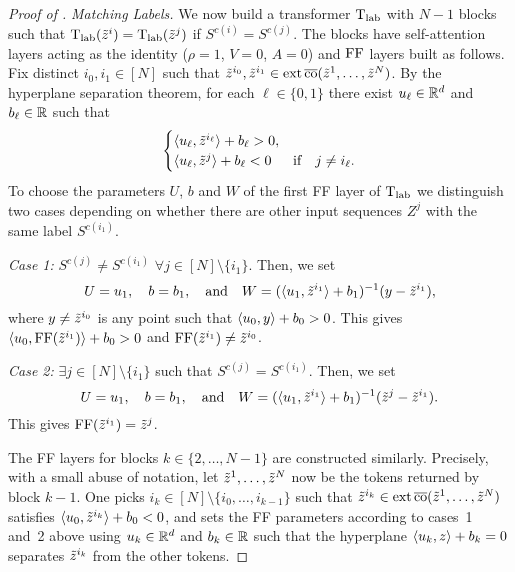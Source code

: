 \documentclass[11pt,a4paper]{amsart}
\begin{document}
\begin{proof}[Proof of ]
\noindent\textit{Matching Labels.} We now build a transformer $\operatorname{\mathrm{T}}_{\text{lab}}$ with $N-1$ blocks such that $\operatorname{\mathrm{T}}_{\text{lab}}(\Tilde{z}^i) = \operatorname{\mathrm{T}}_{\text{lab}}(\Tilde{z}^j)$ if $S^{c(i)}=S^{c(j)}$. The blocks have self-attention layers acting as the identity ($\rho = 1$, $V = 0$, $A = 0$) and $\operatorname{\mathrm{FF}}$ layers built as follows. Fix distinct $i_0, i_1 \in [N]$ such that $\Tilde{z}^{i_0}, \Tilde{z}^{i_1}\in \operatorname{ext} \operatorname{\overline{co}} (\Tilde{z}^1,\dots,\Tilde{z}^N)$. By the hyperplane separation theorem, for each $\ell\in\{0,1\}$ there exist $u_\ell\in\mathbb{R}^d$ and $b_\ell\in \mathbb{R}$ such that
\begin{equation}
\begin{cases} 
   \langle u_\ell, \Tilde{z}^{i_\ell} \rangle + b_\ell >0, \\ 
   \langle u_\ell, \Tilde{z}^j \rangle + b_\ell <0  &\text{if} \quad j \neq i_\ell.  
\end{cases}
\end{equation}
To choose the parameters $U$, $b$ and $W$ of the first FF layer of $\operatorname{\mathrm{T}}_{\textrm{lab}}$ we distinguish two cases depending on whether there are other input sequences $Z^j$ with the same label $S^{c(i_1)}$.

\textit{Case 1:} $S^{c(j)} \neq S^{c(i_1)}$  $\forall j \in [N] \setminus\{i_1\}$. Then, we set 
\begin{equation}
    U = u_1,\quad b = b_1, \quad \text{and} \quad W = (\langle u_1, \Tilde{z}^{i_1} \rangle + b_1)^{-1}(y - \Tilde{z}^{i_1}),
\end{equation} where $y\neq \Tilde{z}^{i_0}$ is any point such that $\langle u_0, y \rangle + b_0 > 0$. This gives $\langle u_0, \operatorname{\mathrm{FF}} (\Tilde{z}^{i_1}) \rangle + b_0 > 0$ and $\operatorname{\mathrm{FF}} (\Tilde{z}^{i_1}) \neq \Tilde{z}^{i_0}$.

\textit{Case 2:} $\exists j\in[N] \setminus\{i_1\}$ such that $S^{c(j)} = S^{c(i_1)}$. Then, we set 
\begin{equation}
    U = u_1, \quad b = b_1, \quad \text{and} \quad W = (\langle u_1, \Tilde{z}^{i_1} \rangle + b_1)^{-1}(\Tilde{z}^j - \Tilde{z}^{i_1}).
\end{equation}
This gives $\operatorname{\mathrm{FF}} (\Tilde{z}^{i_1}) = \Tilde{z}^j$.

The FF layers for blocks $k\in\{2,\ldots,N-1\}$ are constructed similarly. Precisely, with a small abuse of notation, let $\Tilde{z}^{1},\ldots,\Tilde{z}^{N}$ now be the tokens returned by block $k-1$. One picks $i_k \in [N]\setminus\{i_0,\ldots,i_{k-1}\}$ such that $\Tilde{z}^{i_k} \in \operatorname{ext}\operatorname{\overline{co}}(\Tilde{z}^1,\dots,\Tilde{z}^N)$ satisfies $\langle u_0, \Tilde{z}^{i_k} \rangle + b_0 < 0$, and sets the FF parameters according to cases~1 and~2 above using $u_k \in \mathbb{R}^d$ and $b_k \in \mathbb{R}$ such that the hyperplane $\langle u_k, z \rangle+b_k=0$ separates $\Tilde{z}^{i_k}$ from the other tokens.
\vspace{3mm}


\end{proof}
\end{document}

